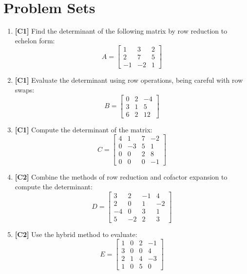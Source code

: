 \documentclass[11pt]{article}
\begin{document}
\newpage

\section{Problem Sets}

\begin{enumerate}

    \item \textbf{[C1]} Find the determinant of the following matrix by row reduction to echelon form:
    \[ A = \begin{bmatrix} 1 & 3 & 2 \\ 2 & 7 & 5 \\ -1 & -2 & 1 \end{bmatrix} \]

    \item \textbf{[C1]} Evaluate the determinant using row operations, being careful with row swaps:
    \[ B = \begin{bmatrix} 0 & 2 & -4 \\ 3 & 1 & 5 \\ 6 & 2 & 12 \end{bmatrix} \]

    \item \textbf{[C1]} Compute the determinant of the matrix:
    \[ C = \begin{bmatrix} 4 & 1 & 7 & -2 \\ 0 & -3 & 5 & 1 \\ 0 & 0 & 2 & 8 \\ 0 & 0 & 0 & -1 \end{bmatrix} \]

    \item \textbf{[C2]} Combine the methods of row reduction and cofactor expansion to compute the determinant:
    \[ D = \begin{bmatrix} 3 & 2 & -1 & 4 \\ 2 & 0 & 1 & -2 \\ -4 & 0 & 3 & 1 \\ 5 & -2 & 2 & 3 \end{bmatrix} \]

    \item \textbf{[C2]} Use the hybrid method to evaluate:
    \[ E = \begin{bmatrix} 1 & 0 & 2 & -1 \\ 3 & 0 & 0 & 4 \\ 2 & 1 & 4 & -3 \\ 1 & 0 & 5 & 0 \end{bmatrix} \]


\end{enumerate}
\end{document}
